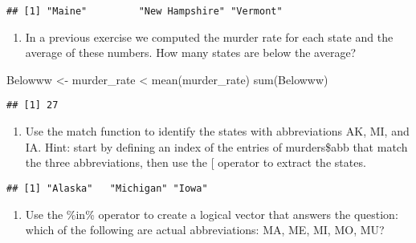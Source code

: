 \documentclass[
]{article}
\newenvironment{Shaded}{\begin{snugshade}}{\end{snugshade}}
\newcommand{\FunctionTok}[1]{\textcolor[rgb]{0.00,0.00,0.00}{#1}}
\newcommand{\NormalTok}[1]{#1}
\newcommand{\OtherTok}[1]{\textcolor[rgb]{0.56,0.35,0.01}{#1}}
\newcommand{\SpecialCharTok}[1]{\textcolor[rgb]{0.00,0.00,0.00}{#1}}
\newcommand{\StringTok}[1]{\textcolor[rgb]{0.31,0.60,0.02}{#1}}
\providecommand{\tightlist}{%
  \setlength{\itemsep}{0pt}\setlength{\parskip}{0pt}}
\begin{document}
\begin{verbatim}
## [1] "Maine"         "New Hampshire" "Vermont"
\end{verbatim}

\begin{enumerate}
\def\labelenumi{\arabic{enumi}.}
\setcounter{enumi}{4}
\tightlist
\item
  In a previous exercise we computed the murder rate for each state and
  the average of these numbers. How many states are below the average?
\end{enumerate}

\begin{Shaded}
\begin{Highlighting}[]
\NormalTok{Belowww }\OtherTok{\textless{}{-}}\NormalTok{ murder\_rate }\SpecialCharTok{\textless{}} \FunctionTok{mean}\NormalTok{(murder\_rate)}
\FunctionTok{sum}\NormalTok{(Belowww)}
\end{Highlighting}
\end{Shaded}

\begin{verbatim}
## [1] 27
\end{verbatim}

\begin{enumerate}
\def\labelenumi{\arabic{enumi}.}
\setcounter{enumi}{5}
\tightlist
\item
  Use the match function to identify the states with abbreviations AK,
  MI, and IA. Hint: start by defining an index of the entries of
  murders\$abb that match the three abbreviations, then use the {[}
  operator to extract the states.
\end{enumerate}

\begin{Shaded}
\end{Shaded}

\begin{verbatim}
## [1] "Alaska"   "Michigan" "Iowa"
\end{verbatim}

\begin{enumerate}
\def\labelenumi{\arabic{enumi}.}
\setcounter{enumi}{6}
\tightlist
\item
  Use the \%in\% operator to create a logical vector that answers the
  question: which of the following are actual abbreviations: MA, ME, MI,
  MO, MU?
\end{enumerate}
\end{document}
